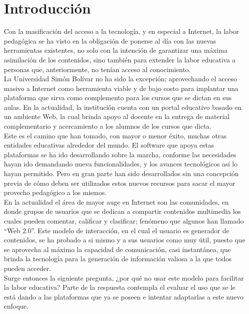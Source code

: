 \section*{Introducción}
Con la masificación del acceso a la tecnología, y en especial a Internet, la labor pedagógica se ha visto en la obligación de ponerse al día con las nuevas herramientas existentes, no solo con la intención de garantizar una máxima asimilación de los contenidos, sino también para extender la labor educativa a personas que, anteriormente, no tenían acceso al conocimiento.\\

La Universidad Simón Bolívar no ha sido la excepción; aprovechando el acceso masivo a Internet como herramienta viable y de bajo costo para implantar una plataforma que sirva como complemento para los cursos que se dictan en sus aulas. En la actualidad, la institución cuenta con un portal educativo basado en un ambiente Web, la cual brinda apoyo al docente en la entrega de material complementario y acercamiento a los alumnos de los cursos que dicta.\\

Este es el camino que han tomado, con mayor o menor éxito, muchas otras entidades educativas alrededor del mundo. El software que apoya estas plataformas se ha ido desarrollando sobre la marcha, conforme las necesidades hayan ido demandando nueva funcionalidades, y los avances tecnológicos así lo hayan permitido. Pero en gran parte han sido desarrollados sin una concepción previa de cómo deben ser utilizados estos nuevos recursos para sacar el mayor provecho pedagógico a los mismos.\\

En la actualidad el área de mayor auge en Internet son las comunidades, en donde grupos de usuarios que se dedican a compartir contenidos multimedia los cuales pueden comentar, calificar y clasificar; fenómeno que algunos han llamado ``Web 2.0''. Este modelo de interacción, en el cual el usuario es generador de contenidos, se ha probado a si mismo y a sus usuarios como muy útil, puesto que se aprovecha al máximo la capacidad de comunicación, casi instantánea, que brinda la tecnología para la generación de información valiosa a la que todos pueden acceder.\\

Surge entonces la siguiente pregunta, ¿por qué no usar este modelo para facilitar la labor educativa? Parte de la respuesta contempla el evaluar el uso que se le está dando a las plataformas que ya se poseen e intentar adaptarlas a este nuevo enfoque.\\

